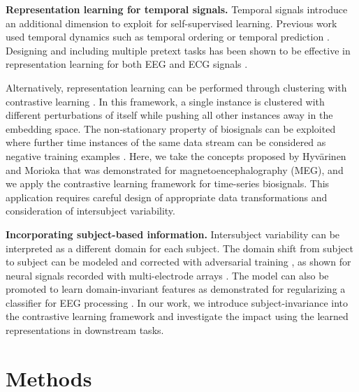 \documentclass{article}
\renewcommand{\paragraph}[1]{\textbf{#1}\hspace{1em}}
\begin{document}
\paragraph{Representation learning for temporal signals.} Temporal signals
introduce an additional dimension to exploit for self-supervised learning.
Previous work used temporal dynamics such as temporal ordering
\cite{misra_shuffle_2016,wei_learning_2018} or temporal prediction
\cite{oord_representation_2019}. Designing and including multiple pretext tasks
\cite{doersch_multi-task_2017} has been shown to be effective in representation
learning for both EEG \cite{banville_self-supervised_2019} and ECG signals
\cite{sarkar_self-supervised_2020}.

Alternatively, representation learning can be performed through clustering with
contrastive learning
\cite{wu_unsupervised_2018,sermanet_time-contrastive_2018,he_momentum_2019,chen_simple_2020}.
In this framework, a single instance is clustered with different perturbations
of itself while pushing all other instances away in the embedding space. The
non-stationary property of biosignals can be exploited where further time
instances of the same data stream can be considered as negative training
examples \cite{hyvarinen_unsupervised_2016}. Here, we take the concepts proposed
by Hyv\"arinen and Morioka \cite{hyvarinen_unsupervised_2016} that was
demonstrated for magnetoencephalography (MEG), and we apply the contrastive
learning framework \cite{chen_simple_2020} for time-series biosignals. This
application requires careful design of appropriate data transformations and
consideration of intersubject variability.

\paragraph{Incorporating subject-based information.} Intersubject variability
can be interpreted as a different domain for each subject. The domain shift from
subject to subject can be modeled and corrected with adversarial training
\cite{tzeng_adversarial_2017}, as shown for neural signals recorded with
multi-electrode arrays \cite{farshchian_adversarial_2019}. The model can also be
promoted to learn domain-invariant features
\cite{tzeng_simultaneous_2015,xie_controllable_2017} as demonstrated for
regularizing a classifier for EEG processing \cite{ozdenizci_learning_2020}. In
our work, we introduce subject-invariance into the contrastive learning
framework and investigate the impact using the learned representations in
downstream tasks. \section{Methods}
\end{document}
